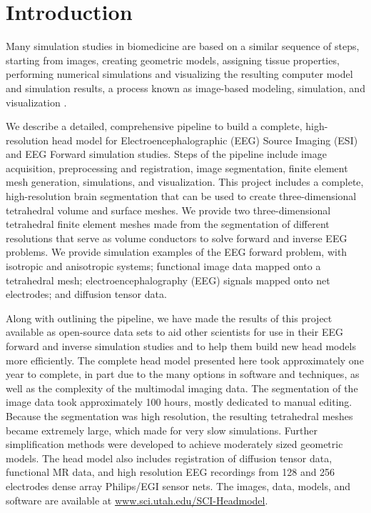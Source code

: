 
\section{Introduction}
\label{sec:intro}

Many simulation studies in biomedicine are based on a similar sequence of steps, starting from images, creating geometric models, assigning tissue properties, performing numerical simulations and visualizing the resulting computer model and simulation results, a process known as image-based modeling, simulation, and visualization \cite{SCI:Mac2009a,SCI:Joh2015c,SCI:Joh2012a,SCI:Joh2006a,SCI:Joh2004b}.

We describe a detailed, comprehensive pipeline to build a complete, high-resolution head model for Electroencephalographic (EEG) Source Imaging (ESI) and EEG Forward simulation studies.  Steps of the pipeline include image acquisition, preprocessing and registration, image segmentation, finite element mesh generation, simulations, and visualization. This project includes a complete, high-resolution brain segmentation that can be used to create three-dimensional tetrahedral volume and surface meshes. We provide two three-dimensional tetrahedral finite element meshes made from the segmentation of different resolutions that serve as volume conductors to solve forward and inverse EEG problems. We provide simulation examples of the EEG forward problem, with isotropic and anisotropic systems; functional image data mapped onto a tetrahedral mesh; electroencephalography (EEG) signals mapped onto net electrodes; and diffusion tensor data.

Along with outlining the pipeline, we have made the results of this project available as open-source data sets to aid other scientists for use in their EEG forward and inverse simulation studies and to help them build new head models more efficiently. The complete head model presented here took approximately one year to complete, in part due to the many options in software and techniques, as well as the complexity of the multimodal imaging data. The segmentation of the image data took approximately 100 hours, mostly dedicated to manual editing. Because the segmentation was high resolution, the resulting tetrahedral meshes became extremely large, which made for very slow simulations. Further simplification methods were developed to achieve moderately sized geometric models.  The head model also includes registration of diffusion tensor data, functional MR data, and high resolution EEG recordings from 128 and 256 electrodes dense array Philips/EGI sensor nets. The images, data, models, and software are
available at \url{www.sci.utah.edu/SCI-Headmodel}.